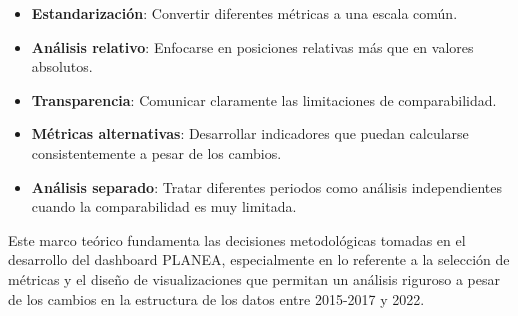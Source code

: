 \begin{itemize}
    \item \textbf{Estandarización}: Convertir diferentes métricas a una escala común.
    \item \textbf{Análisis relativo}: Enfocarse en posiciones relativas más que en valores absolutos.
    \item \textbf{Transparencia}: Comunicar claramente las limitaciones de comparabilidad.
    \item \textbf{Métricas alternativas}: Desarrollar indicadores que puedan calcularse consistentemente a pesar de los cambios.
    \item \textbf{Análisis separado}: Tratar diferentes periodos como análisis independientes cuando la comparabilidad es muy limitada.
\end{itemize}

Este marco teórico fundamenta las decisiones metodológicas tomadas en el desarrollo del dashboard PLANEA, especialmente en lo referente a la selección de métricas y el diseño de visualizaciones que permitan un análisis riguroso a pesar de los cambios en la estructura de los datos entre 2015-2017 y 2022.

